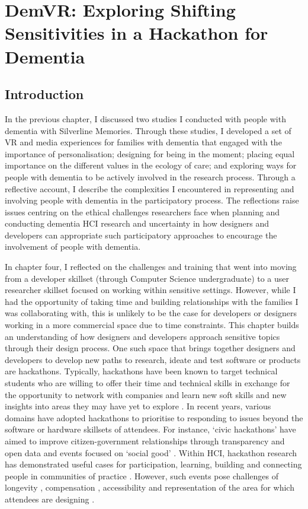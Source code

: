 \chapter{DemVR: Exploring Shifting Sensitivities in a Hackathon for Dementia}
\label{DemVR}

\section{Introduction}
\label{sec:DemVRIntroduction}
In the previous chapter, I discussed two studies I conducted with people with dementia with Silverline Memories. Through these studies, I developed a set of VR and media experiences for families with dementia that engaged with the importance of personalisation; designing for being in the moment; placing equal importance on the different values in the ecology of care; and exploring ways for people with dementia to be actively involved in the research process. Through a reflective account, I describe the complexities I encountered in representing and involving people with dementia in the participatory process. The reflections raise issues centring on the ethical challenges researchers face when planning and conducting dementia HCI research and uncertainty in how designers and developers can appropriate such participatory approaches to encourage the involvement of people with dementia.

In chapter four, I reflected on the challenges and training that went into moving from a developer skillset (through Computer Science undergraduate) to a user researcher skillset focused on working within sensitive settings. However, while I had the opportunity of taking time and building relationships with the families I was collaborating with, this is unlikely to be the case for developers or designers working in a more commercial space due to time constraints. This chapter builds an understanding of how designers and developers approach sensitive topics through their design process. One such space that brings together designers and developers to develop new paths to research, ideate and test software or products are hackathons. Typically, hackathons have been known to target technical students who are willing to offer their time and technical skills in exchange for the opportunity to network with companies and learn new soft skills and new insights into areas they may have yet to explore \citep{olesen_what_2021}. In recent years, various domains have adopted hackathons to prioritise to responding to issues beyond the software or hardware skillsets of attendees. For instance, `civic hackathons' \citep{johnson_civic_2014} have aimed to improve citizen-government relationships through transparency and open data and events focused on `social good' \citep{ferrario_software_2014}. Within HCI, hackathon research has demonstrated useful cases for participation, learning, building and connecting people in communities of practice \citep{falk_olesen_10_2020, birbeck_self_2017, hou_hacking_2017, johnson_civic_2014} . However, such events pose challenges of longevity \citep{birbeck_self_2017}, compensation \citep{endrissat_hackathons_2018}, accessibility \citep{hope_hackathons_2019} and representation of the area for which attendees are designing \citep{toombs_hackerspace_2017}. 

